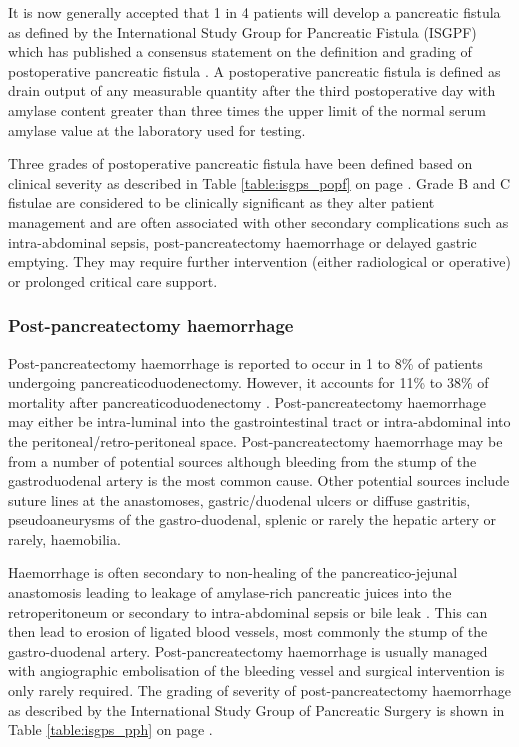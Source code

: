It is now generally accepted that 1 in 4 patients will develop a pancreatic fistula as defined by the International Study Group for Pancreatic Fistula (ISGPF) which has published a consensus statement on the definition and grading of postoperative pancreatic fistula \parencite{bassi_postoperative_2005}. 
A postoperative pancreatic fistula is defined as drain output of any measurable quantity after the third postoperative day with amylase content greater than three times the upper limit of the normal serum amylase value at the laboratory used for testing. 

Three grades of postoperative pancreatic fistula have been defined based on clinical severity as described in Table \ref{table:isgps_popf} on page \pageref{table:isgps_popf}. 
Grade B and C fistulae are considered to be clinically significant as they alter patient management and are often associated with other secondary complications such as intra-abdominal sepsis, post-pancreatectomy haemorrhage or delayed gastric emptying. 
They may require further intervention (either radiological or operative) or prolonged critical care support. 

\subsubsection{Post-pancreatectomy haemorrhage}
\label{sec:ch_intro_PPH}
Post-pancreatectomy haemorrhage is reported to occur in 1 to 8\% of patients undergoing pancreaticoduodenectomy. 
However, it accounts for 11\% to 38\% of mortality after pancreaticoduodenectomy \parencite{wente_postpancreatectomy_2007}. 
Post-pancreatectomy haemorrhage may either be intra-luminal into the gastrointestinal tract or intra-abdominal into the peritoneal/retro-peritoneal space. 
Post-pancreatectomy haemorrhage may be from a number of potential sources although bleeding from the stump of the gastroduodenal artery is the most common cause. 
Other potential sources include suture lines at the anastomoses, gastric/duodenal ulcers or diffuse gastritis, pseudoaneurysms of the gastro-duodenal, splenic or rarely the hepatic artery or rarely, haemobilia.

Haemorrhage is often secondary to non-healing of the pancreatico-jejunal anastomosis leading to leakage of amylase-rich pancreatic juices into the retroperitoneum or secondary to intra-abdominal sepsis or bile leak \parencite{tien_risk_2005, koukoutsis_haemorrhage_2006, choi_delayed_2004, balladur_bleeding_1996}. 
This can then lead to erosion of ligated blood vessels, most commonly the stump of the gastro-duodenal artery. 
Post-pancreatectomy haemorrhage is usually managed with angiographic embolisation of the bleeding vessel and surgical intervention is only rarely required. 
The grading of severity of post-pancreatectomy haemorrhage as described by the International Study Group of Pancreatic Surgery \parencite{wente_postpancreatectomy_2007} is shown in Table \ref{table:isgps_pph} on page \pageref{table:isgps_pph}.

